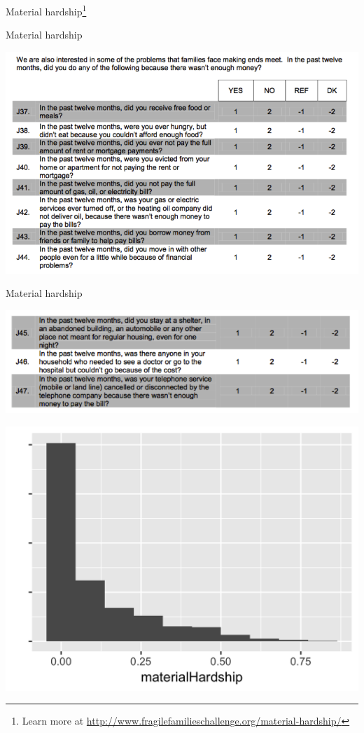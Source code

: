 \documentclass[aspectratio=169]{beamer}
\begin{document}
\begin{frame}

\Large{
\begin{center}
Material hardship\footnote{Learn more at \url{http://www.fragilefamilieschallenge.org/material-hardship/}} 
\end{center}
}

\end{frame}
\begin{frame}{Material hardship}

\centering
\includegraphics[width = .9\textwidth]{figures/materialHardship_questionnaireA}

\end{frame}
\begin{frame}{Material hardship}

\centering
\includegraphics[width = .9\textwidth]{figures/materialHardship_questionnaireB}

\end{frame}
\begin{frame}

\centering
\includegraphics[width = .8\textwidth]{figures/materialHardshipDist}

\end{frame}
\end{document}
